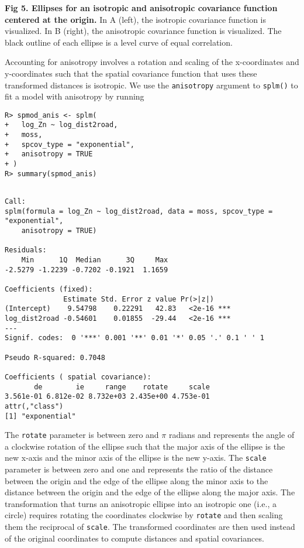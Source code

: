 \documentclass[10pt,letterpaper]{article}
\begin{document}
\textbf{Fig 5. Ellipses for an isotropic and anisotropic covariance
function centered at the origin.} In A (left), the isotropic covariance
function is visualized. In B (right), the anisotropic covariance
function is visualized. The black outline of each ellipse is a level
curve of equal correlation.

Accounting for anisotropy involves a rotation and scaling of the
x-coordinates and y-coordinates such that the spatial covariance
function that uses these transformed distances is isotropic. We use the
\texttt{anisotropy} argument to \texttt{splm()} to fit a model with
anisotropy by running

\begin{verbatim}
R> spmod_anis <- splm(
+   log_Zn ~ log_dist2road,
+   moss,
+   spcov_type = "exponential",
+   anisotropy = TRUE
+ )
R> summary(spmod_anis)
\end{verbatim}

\begin{verbatim}

Call:
splm(formula = log_Zn ~ log_dist2road, data = moss, spcov_type = "exponential", 
    anisotropy = TRUE)

Residuals:
    Min      1Q  Median      3Q     Max 
-2.5279 -1.2239 -0.7202 -0.1921  1.1659 

Coefficients (fixed):
              Estimate Std. Error z value Pr(>|z|)    
(Intercept)    9.54798    0.22291   42.83   <2e-16 ***
log_dist2road -0.54601    0.01855  -29.44   <2e-16 ***
---
Signif. codes:  0 '***' 0.001 '**' 0.01 '*' 0.05 '.' 0.1 ' ' 1

Pseudo R-squared: 0.7048

Coefficients ( spatial covariance):
       de        ie     range    rotate     scale 
3.561e-01 6.812e-02 8.732e+03 2.435e+00 4.753e-01 
attr(,"class")
[1] "exponential"
\end{verbatim}

The \texttt{rotate} parameter is between zero and \(\pi\) radians and
represents the angle of a clockwise rotation of the ellipse such that
the major axis of the ellipse is the new x-axis and the minor axis of
the ellipse is the new y-axis. The \texttt{scale} parameter is between
zero and one and represents the ratio of the distance between the origin
and the edge of the ellipse along the minor axis to the distance between
the origin and the edge of the ellipse along the major axis. The
transformation that turns an anisotropic ellipse into an isotropic one
(i.e., a circle) requires rotating the coordinates clockwise by
\texttt{rotate} and then scaling them the reciprocal of \texttt{scale}.
The transformed coordinates are then used instead of the original
coordinates to compute distances and spatial covariances.
\end{document}
